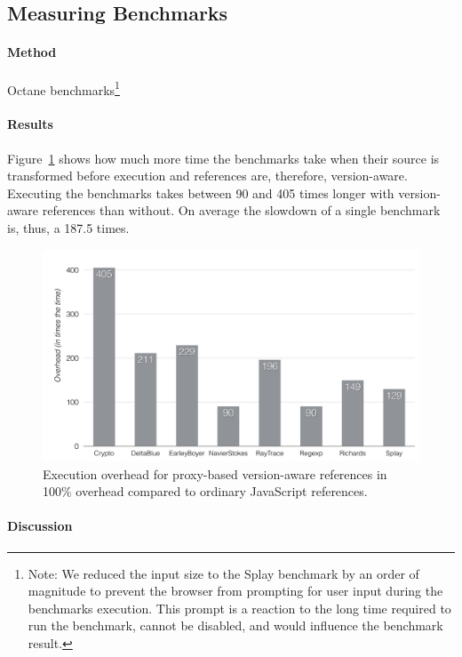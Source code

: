 \subsection{Measuring Benchmarks}

\paragraph{Method}
Octane benchmarks\footnote{Note: We reduced the input size to the Splay benchmark by an order of magnitude to prevent the browser from prompting for user input during the benchmarks execution. This prompt is a reaction to the long time required to run the benchmark, cannot be disabled, and would influence the benchmark result.}

\paragraph{Results}
Figure~\ref{fig:ExecutionOverhead} shows how much more time the benchmarks take when their source is transformed before execution and references are, therefore, version-aware.
Executing the benchmarks takes between 90 and 405 times longer with version-aware references than without.
On average the slowdown of a single benchmark is, thus, a 187.5 times.

\begin{figure}[h]
    \centering
    \includegraphics[width=\textwidth]{figures/6_evaluation/3_executionOverhead.pdf}
    \caption{Execution overhead for proxy-based version-aware references in 100\% overhead compared to ordinary JavaScript references.}
    \label{fig:ExecutionOverhead}
\end{figure}

\paragraph{Discussion}



